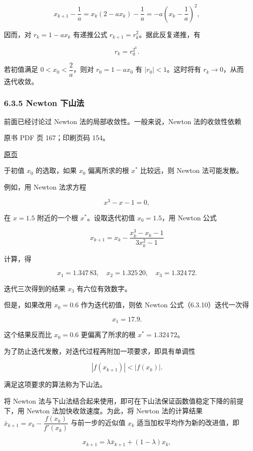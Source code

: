 \[
x_{k+1}-\frac{1}{a}=x_k(2-ax_k)-\frac{1}{a}=-a\left(x_k-\frac{1}{a}\right)^2,
\]

因而，对 \(r_k=1-ax_k\) 有递推公式 \(r_{k+1}=r_k^2\)。据此反复递推，有

\[
r_k=r_0^{2^k}.
\]

若初值满足 \(0<x_0<\dfrac{2}{a}\)，则对 \(r_0=1-ax_0\) 有 \(|r_0|<1\)。这时将有 \(r_k\to0\)，从而迭代收敛。

\subsubsection{6.3.5 Newton 下山法}\label{ch06-newton-ux4e0bux5c71ux6cd5}

前面已经讨论过 Newton 法的局部收敛性。一般来说，Newton 法的收敛性依赖

\clearpage

原书 PDF 页 167；印刷页码 154。

\href{source-images/pdf-167.jpeg}{原页}

于初值 \(x_0\) 的选取，如果 \(x_0\) 偏离所求的根 \(x^*\) 比较远，则 Newton 法可能发散。

例如，用 Newton 法求方程

\[
x^3-x-1=0,
\tag{6.3.9}
\]

在 \(x=1.5\) 附近的一个根 \(x^*\)。设取迭代初值 \(x_0=1.5\)，用 Newton 公式

\[
x_{k+1}=x_k-\frac{x_k^3-x_k-1}{3x_k^2-1}
\tag{6.3.10}
\]

计算，得

\[
x_1=1.347\,83,\quad x_2=1.325\,20,\quad x_3=1.324\,72.
\]

迭代三次得到的结果 \(x_3\) 有六位有效数字。

但是，如果改用 \(x_0=0.6\) 作为迭代初值，则依 Newton 公式（6.3.10）迭代一次得

\[
x_1=17.9.
\]

这个结果反而比 \(x_0=0.6\) 更偏离了所求的根 \(x^*=1.324\,72\)。

为了防止迭代发散，对迭代过程再附加一项要求，即具有单调性

\[
|f(x_{k+1})|<|f(x_k)|.
\tag{6.3.11}
\]

满足这项要求的算法称为下山法。

将 Newton 法与下山法结合起来使用，即可在下山法保证函数值稳定下降的前提下，用 Newton 法加快收敛速度。为此，将 Newton 法的计算结果 \(\bar{x}_{k+1}=x_k-\dfrac{f(x_k)}{f'(x_k)}\) 与前一步的近似值 \(x_k\) 适当加权平均作为新的改进值，即

\[
x_{k+1}=\lambda\bar{x}_{k+1}+(1-\lambda)x_k,
\tag{6.3.12}
\]

